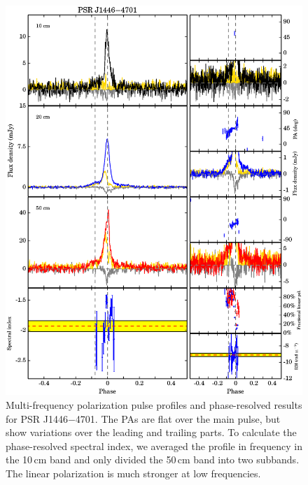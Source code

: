 \documentclass[useAMS,usenatbib]{mn2e}
\begin{document}
\begin{appendix}
\begin{figure}
\begin{center}
\includegraphics[width=6 in]{1446.ps}
\caption{Multi-frequency polarization pulse profiles and phase-resolved results for PSR J1446$-$4701. 
The PAs are flat over the main pulse, but show variations over the leading and 
trailing parts.
%
To calculate the phase-resolved spectral index, we averaged the profile 
in frequency in the 10\,cm band and only divided the 50\,cm band 
into two subbands.
%
The linear polarization is much stronger at low frequencies.
}
\label{1446}
\end{center}
\end{figure}


\end{appendix}
\end{document}
